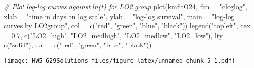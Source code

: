 \documentclass[
]{article}
\newenvironment{Shaded}{\begin{snugshade}}{\end{snugshade}}
\newcommand{\AttributeTok}[1]{\textcolor[rgb]{0.77,0.63,0.00}{#1}}
\newcommand{\CommentTok}[1]{\textcolor[rgb]{0.56,0.35,0.01}{\textit{#1}}}
\newcommand{\FloatTok}[1]{\textcolor[rgb]{0.00,0.00,0.81}{#1}}
\newcommand{\FunctionTok}[1]{\textcolor[rgb]{0.00,0.00,0.00}{#1}}
\newcommand{\NormalTok}[1]{#1}
\newcommand{\OtherTok}[1]{\textcolor[rgb]{0.56,0.35,0.01}{#1}}
\newcommand{\SpecialCharTok}[1]{\textcolor[rgb]{0.00,0.00,0.00}{#1}}
\newcommand{\StringTok}[1]{\textcolor[rgb]{0.31,0.60,0.02}{#1}}
\begin{document}
\begin{Shaded}
\begin{Highlighting}[]
\CommentTok{\# Plot log{-}log curves against ln(t) for LO2.group}
\FunctionTok{plot}\NormalTok{(kmfitO24, }\AttributeTok{fun =} \StringTok{"cloglog"}\NormalTok{, }\AttributeTok{xlab =} \StringTok{"time in days on log scale"}\NormalTok{, }\AttributeTok{ylab =} \StringTok{"log{-}log survival"}\NormalTok{,}
    \AttributeTok{main =} \StringTok{"log{-}log curves by LO2group"}\NormalTok{, }\AttributeTok{col =} \FunctionTok{c}\NormalTok{(}\StringTok{"red"}\NormalTok{, }\StringTok{"green"}\NormalTok{, }\StringTok{"blue"}\NormalTok{, }\StringTok{"black"}\NormalTok{))}
\FunctionTok{legend}\NormalTok{(}\StringTok{"topleft"}\NormalTok{, }\AttributeTok{cex =} \FloatTok{0.7}\NormalTok{, }\FunctionTok{c}\NormalTok{(}\StringTok{"LO2=high"}\NormalTok{, }\StringTok{"LO2=medhigh"}\NormalTok{, }\StringTok{"LO2=medlow"}\NormalTok{, }\StringTok{"LO2=low"}\NormalTok{),}
    \AttributeTok{lty =} \FunctionTok{c}\NormalTok{(}\StringTok{"solid"}\NormalTok{), }\AttributeTok{col =} \FunctionTok{c}\NormalTok{(}\StringTok{"red"}\NormalTok{, }\StringTok{"green"}\NormalTok{, }\StringTok{"blue"}\NormalTok{, }\StringTok{"black"}\NormalTok{))}
\end{Highlighting}
\end{Shaded}

\texttt{[image: HW5\_629Solutions\_files/figure-latex/unnamed-chunk-6-1.pdf]}

\begin{Shaded}
\end{Shaded}
\end{document}
